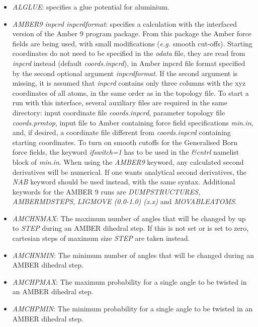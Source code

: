 \documentclass[12pt,a4paper,dvips]{article}
\begin{document}
\begin{itemize}
\item {\it ALGLUE\/}: specifies a glue potential for aluminium.

\item {\it AMBER9 inpcrd inpcrdformat\/}: specifies a calculation with the interfaced
version of the Amber 9 program package. From this package the Amber force fields
are being used, with small modifications ({\it e.g.} smooth cut-offs).
Starting coordinates do not need to be specified in the {\it odata} file, they
are read from {\it inpcrd} instead (default {\it coords.inpcrd}), in Amber inpcrd
file format specified by the second optional argument {\it inpcrdformat}.
If the second argument is missing, it is assumed that {\it inpcrd} contains
only three columns with the xyz coordinates of all atoms, in the same order
as in the topology file. To start a run with this interface,
several auxiliary files are required in the same directory: input coordinate file
{\it coords.inpcrd}, parameter topology file {\it coords.prmtop},
input file to Amber containing force field specifications {\it min.in}, and, if
desired, a coordinate file different from {\it coords.inpcrd} containing
starting coordinates.
To turn on smooth cutoffs for the Generalised Born force fields, the keyword
{\it ifswitch=1} has to be used in the {\it \&cntrl} namelist block of {\it min.in}.
When using the {\it AMBER9} keyword, any calculated second derivatives will be
numerical. If one wants analytical second derivatives, the {\it NAB} keyword
should be used instead, with the same syntax. 
Additional keywords for the AMBER 9 runs are {\it DUMPSTRUCTURES}, {\it AMBERMDSTEPS},
{\it LIGMOVE (0.0-1.0) (x.x)} and {\it MOVABLEATOMS}.

\item {\it AMCHNMAX\/}: The maximum number of angles that will be changed by up to {\it STEP\/} during an 
AMBER dihedral step. If this is not set or is set to zero, cartesian steps of maximum size {\it STEP\/} are taken 
instead. 

\item {\it AMCHNMIN\/}: The minimum number of angles that will be changed during an AMBER dihedral step.

\item {\it AMCHPMAX\/}: The maximum probability for a single angle to be twisted in an AMBER dihedral step.

\item {\it AMCHPMIN\/}: The minimum probability for a single angle to be twisted in an AMBER dihedral step.


\end{itemize}
\end{document}
